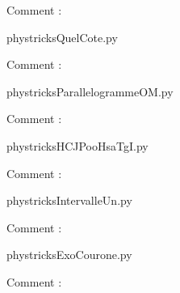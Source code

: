    Comment : 

    \clearpage
    


    \newcommand{\CaptionFigQuelCote}{<+Type your caption here+>}
    \begin{center}
        
    \end{center}
    phystricksQuelCote.py

    Comment : 

    \clearpage
    


    \newcommand{\CaptionFigParallelogrammeOM}{<+Type your caption here+>}
    \begin{center}
        
    \end{center}
    phystricksParallelogrammeOM.py

    Comment : 

    \clearpage
    


    \newcommand{\CaptionFigHCJPooHsaTgI}{<+Type your caption here+>}
    \begin{center}
        
    \end{center}
    phystricksHCJPooHsaTgI.py

    Comment : 

    \clearpage
    


    \newcommand{\CaptionFigIntervalleUn}{<+Type your caption here+>}
    \begin{center}
        
    \end{center}
    phystricksIntervalleUn.py

    Comment : 

    \clearpage
    


    \newcommand{\CaptionFigExoCourone}{<+Type your caption here+>}
    \begin{center}
        
    \end{center}
    phystricksExoCourone.py

    Comment : 

    \clearpage
    

